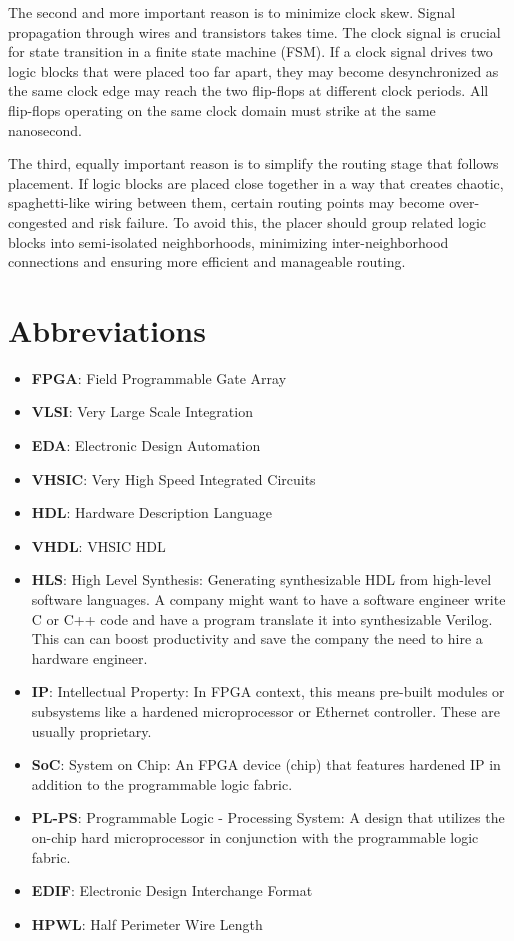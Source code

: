 \documentclass{article}
\begin{document}
    The second and more important reason is to minimize clock skew. 
    Signal propagation through wires and transistors takes time. 
    The clock signal is crucial for state transition in a finite state machine (FSM).
    If a clock signal drives two logic blocks that were placed too far apart, they may become desynchronized as the same clock edge may reach the two flip-flops at different clock periods.
    All flip-flops operating on the same clock domain must strike at the same nanosecond.

    The third, equally important reason is to simplify the routing stage that follows placement. If logic blocks are placed close together in a way that creates chaotic, spaghetti-like wiring between them, certain routing points may become over-congested and risk failure. To avoid this, the placer should group related logic blocks into semi-isolated neighborhoods, minimizing inter-neighborhood connections and ensuring more efficient and manageable routing.
   

\section{Abbreviations}
    \begin{itemize}[label={--}, left=0.25cm]
        \item \textbf{FPGA}: Field Programmable Gate Array
        \item \textbf{VLSI}: Very Large Scale Integration
        \item \textbf{EDA}: Electronic Design Automation
        \item \textbf{VHSIC}: Very High Speed Integrated Circuits
        \item \textbf{HDL}: Hardware Description Language
        \item \textbf{VHDL}: VHSIC HDL
        \item \textbf{HLS}: High Level Synthesis: Generating synthesizable HDL from high-level software languages. A company might want to have a software engineer write C or C++ code and have a program translate it into synthesizable Verilog. This can can boost productivity and save the company the need to hire a hardware engineer.
        \item \textbf{IP}: Intellectual Property: In FPGA context, this means pre-built modules or subsystems like a hardened microprocessor or Ethernet controller. These are usually proprietary.
        \item \textbf{SoC}: System on Chip: An FPGA device (chip) that features hardened IP in addition to the programmable logic fabric.
        \item \textbf{PL-PS}: Programmable Logic - Processing System: A design that utilizes the on-chip hard microprocessor in conjunction with the programmable logic fabric.
        \item \textbf{EDIF}: Electronic Design Interchange Format
        \item \textbf{HPWL}: Half Perimeter Wire Length
    \end{itemize}
\end{document}
